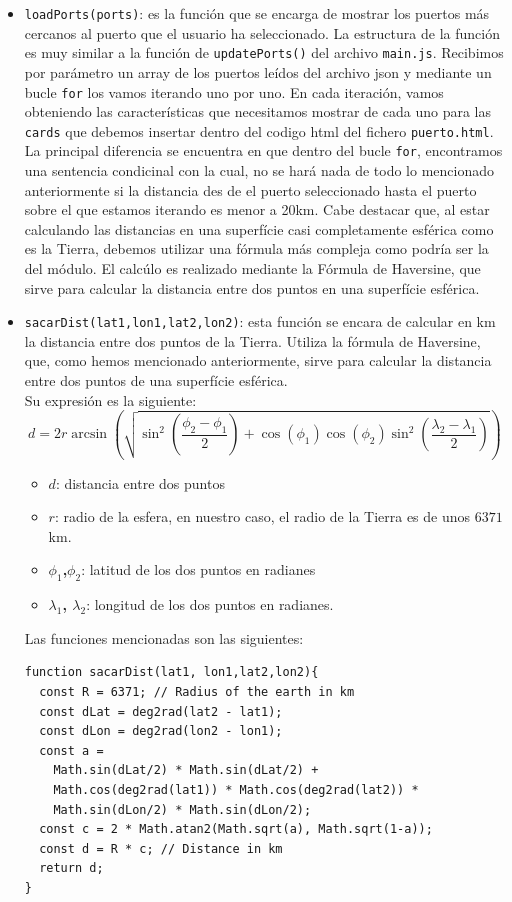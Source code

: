 \documentclass{article}
\begin{document}
\begin{itemize}
    \item \texttt{loadPorts(ports)}: es la función que se encarga de mostrar los puertos más cercanos al puerto que el usuario ha seleccionado. La estructura de la función es muy similar a la función de \texttt{updatePorts()} del archivo \texttt{main.js}. Recibimos por parámetro un array de los puertos leídos del archivo json y mediante un bucle \texttt{for} los vamos iterando uno por uno. En cada iteración, vamos obteniendo las características que necesitamos mostrar de cada uno para las \texttt{cards} que debemos insertar dentro del codigo html del fichero \texttt{puerto.html}. La principal diferencia se encuentra en que dentro del bucle \texttt{for}, encontramos una sentencia condicinal con la cual, no se hará nada de todo lo mencionado anteriormente si la distancia des de el puerto seleccionado hasta el puerto sobre el que estamos iterando es menor a 20km. Cabe destacar que, al estar calculando las distancias en una superfície casi completamente esférica como es la Tierra, debemos utilizar una fórmula más compleja como podría ser la del módulo. El calcúlo es realizado mediante la Fórmula de Haversine, que sirve para calcular la distancia entre dos puntos en una superfície esférica. 


        \item \texttt{sacarDist(lat1,lon1,lat2,lon2)}: esta función se encara de calcular en km la distancia entre dos puntos de la Tierra. Utiliza la fórmula de Haversine, que, como hemos mencionado anteriormente, sirve para calcular la distancia entre dos puntos de una superfície esférica.\\Su expresión es la siguiente:
            \begin{equation*}
                d = 2r \arcsin\left(\sqrt{\sin^2\left(\frac{\phi_2-\phi_1}{2}\right) + \cos(\phi_1) \cos(\phi_2) \sin^2\left(\frac{\lambda_2-\lambda_1}{2}\right)}\right)
            \end{equation*}
            \begin{itemize}
                \item \textbf{$d$}: distancia entre dos puntos
                \item \textbf{$r$}: radio de la esfera, en nuestro caso, el radio de la Tierra es de unos $6371$km.
                \item \textbf{$\phi_1$,$\phi_2$}: latitud de los dos puntos en radianes
                \item \textbf{$\lambda_1$, $\lambda_2$}: longitud de los dos puntos en radianes.
            \end{itemize}
    Las funciones mencionadas son las siguientes:
    \begin{verbatim}
function sacarDist(lat1, lon1,lat2,lon2){
  const R = 6371; // Radius of the earth in km
  const dLat = deg2rad(lat2 - lat1);
  const dLon = deg2rad(lon2 - lon1); 
  const a = 
    Math.sin(dLat/2) * Math.sin(dLat/2) +
    Math.cos(deg2rad(lat1)) * Math.cos(deg2rad(lat2)) * 
    Math.sin(dLon/2) * Math.sin(dLon/2); 
  const c = 2 * Math.atan2(Math.sqrt(a), Math.sqrt(1-a)); 
  const d = R * c; // Distance in km
  return d;
}


\end{verbatim}
\end{itemize}
\end{document}
